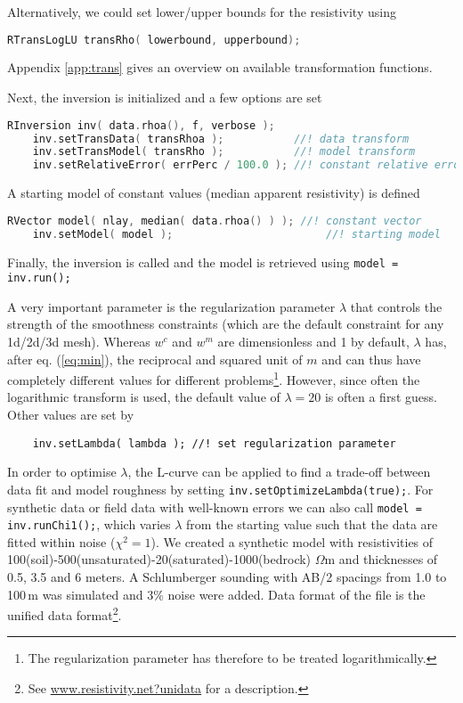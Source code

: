 Alternatively, we could set lower/upper bounds for the resistivity using
\begin{lstlisting}[language=C++]
    RTransLogLU transRho( lowerbound, upperbound);
\end{lstlisting}
Appendix \ref{app:trans} gives an overview on available transformation functions.

Next, the inversion is initialized and a few options are set
\begin{lstlisting}[language=C++]
    RInversion inv( data.rhoa(), f, verbose );
    inv.setTransData( transRhoa );           //! data transform
    inv.setTransModel( transRho );           //! model transform
    inv.setRelativeError( errPerc / 100.0 ); //! constant relative error
\end{lstlisting}

A starting model of constant values (median apparent resistivity) is defined
\begin{lstlisting}[language=C++]
    RVector model( nlay, median( data.rhoa() ) ); //! constant vector
    inv.setModel( model );                        //! starting model
\end{lstlisting}

Finally, the inversion is called and the model is retrieved using \lstinline|model = inv.run();|

A very important parameter is the regularization parameter $\lambda$ that controls the strength of the smoothness constraints (which are the default constraint for any 1d/2d/3d mesh).
Whereas $w^c$ and $w^m$ are dimensionless and 1 by default, $\lambda$ has, after eq. (\ref{eq:min}), the reciprocal and squared unit of $m$ and can thus have completely different values for different problems\footnote{The regularization parameter has therefore to be treated logarithmically.}.
However, since often the logarithmic transform is used, the default value of $\lambda=20$ is often a first guess.
Other values are set by
\begin{lstlisting}
    inv.setLambda( lambda ); //! set regularization parameter
\end{lstlisting}

In order to optimise $\lambda$, the L-curve \citep{guentherruecker06,guentherdiss} can be applied to find a trade-off between data fit and model roughness by setting \lstinline|inv.setOptimizeLambda(true);|.
For synthetic data or field data with well-known errors we can also call \lstinline|model = inv.runChi1();|, which varies $\lambda$ from the starting value such that the data are fitted within noise ($\chi^2=1$).
We created a synthetic model with resistivities of 100(soil)-500(unsaturated)-20(saturated)-1000(bedrock) $\Omega$m and thicknesses of 0.5, 3.5 and 6 meters.
A Schlumberger sounding with AB/2 spacings from 1.0 to 100\,m was simulated and 3\% noise were added.
Data format of the file  is the unified data format\footnote{See \url{www.resistivity.net?unidata} for a description.}.

